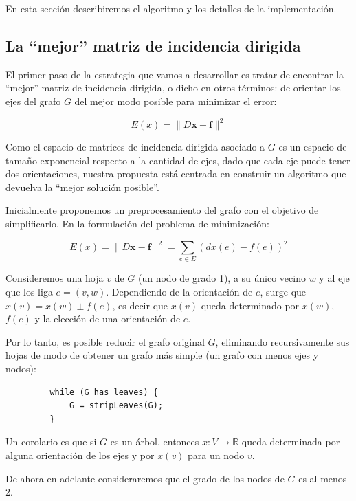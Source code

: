 \documentclass[conference,compsoc,a4paper]{IEEEtran}
\begin{document}
En esta sección describiremos el algoritmo y los detalles de la 
implementación.

\subsection{La ``mejor'' matriz de incidencia dirigida}

El primer paso de la estrategia que vamos a desarrollar es tratar de 
encontrar la ``mejor'' matriz de incidencia dirigida, o dicho en otros 
términos: de orientar los ejes del grafo $G$ del mejor modo posible para 
minimizar el error:

$$E(x) = \|D\bm{x}-\bm{f}\|^2$$
 
Como el espacio de matrices de incidencia dirigida asociado a $G$ es un 
espacio de tamaño exponencial respecto a la cantidad de ejes, dado que 
cada eje puede tener dos orientaciones, nuestra propuesta está centrada 
en construir un algoritmo que devuelva la ``mejor solución posible''.

\bigskip


Inicialmente proponemos un preprocesamiento del grafo con el objetivo de 
simplificarlo. En la formulación del problema de minimización:

$$E(x) = \|D\bm{x}-\bm{f}\|^2 = \sum_{e \in E} (dx(e) - f(e))^2$$

Consideremos una hoja $v$ de $G$ (un nodo de grado 1), a su único 
vecino $w$ y al eje que los liga $e=(v,w)$. Dependiendo de la 
orientación de $e$, surge que $x(v) = x(w) \pm 
f(e)$, es decir que $x(v)$ queda determinado por $x(w)$, $f(e)$ y la 
elección de una orientación de $e$.

\smallskip

Por lo tanto, es posible reducir el grafo original $G$, eliminando 
recursivamente sus  hojas de modo de obtener un grafo más simple (un 
grafo con menos ejes y nodos):

\begin{verbatim}
         while (G has leaves) {
             G = stripLeaves(G);
         }
\end{verbatim}

Un corolario es que si $G$ es un árbol, entonces $x: V 
\rightarrow \mathbb{R}$ queda determinada por alguna orientación de 
los ejes y por $x(v)$ para un nodo $v$.

\smallskip

De ahora en adelante consideraremos que el grado de los nodos de $G$ es 
al menos 2.
 
\end{document}
